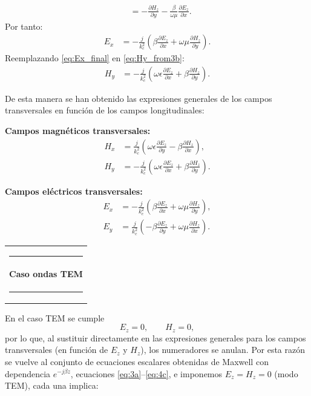 \documentclass[
  11pt,
  letterpaper,
   addpoints,
   answers
  ]{exam}
\makeatletter
\newlength{\rulelength}
\newcommand{\modtitle}[1]{%
  \settowidth{\rulelength}{\textbf{#1}}%
  \par\addvspace{6pt}\noindent%
  \begin{tabular}{@{}l@{}}
    \rule{\rulelength}{0.5pt}\\[3pt]%
    \textbf{#1}\\[3pt]%
    \rule{\rulelength}{0.5pt}%
  \end{tabular}%
  \par\addvspace{8pt}%
}
\makeatother
\begin{document}
\begin{questions}
\begin{parts}
\begin{solution}
\begin{minipage}[t]{0.49\linewidth}
\begin{align*}
&=-\frac{\partial H_z}{\partial y}-\frac{\beta}{\omega\mu}\frac{\partial E_z}{\partial x}.
\end{align*}
Por tanto:
\begin{align}
E_x&=-\frac{j}{k_c^2}\left(\beta\frac{\partial E_z}{\partial x}+\omega\mu\frac{\partial H_z}{\partial y}\right).
\label{eq:Ex_final}
\end{align}
Reemplazando \eqref{eq:Ex_final} en \eqref{eq:Hy_from3b}:
\begin{align}
H_y&=-\frac{j}{k_c^2}\left(\omega\epsilon\frac{\partial E_z}{\partial x}+\beta\frac{\partial H_z}{\partial y}\right).
\label{eq:Hy_final}
\end{align}
\end{minipage}
De esta manera se han obtenido las expresiones generales de los campos transversales en función de los campos longitudinales:
\newpage
\noindent
\begin{minipage}[t]{0.485\linewidth}
\textbf{Campos magnéticos transversales:}\\[-2pt]
\begin{align}
H_x &= \frac{j}{k_c^2}\!\left(\omega\epsilon\frac{\partial E_z}{\partial y}-\beta\frac{\partial H_z}{\partial x}\right),\\[4pt]
H_y &= -\frac{j}{k_c^2}\!\left(\omega\epsilon\frac{\partial E_z}{\partial x}+\beta\frac{\partial H_z}{\partial y}\right).
\end{align}
\end{minipage}%
\hfill
\begin{minipage}[t]{0.485\linewidth}
\textbf{Campos eléctricos transversales:}\\[-2pt]
\begin{align}
E_x &= -\frac{j}{k_c^2}\!\left(\beta\frac{\partial E_z}{\partial x}+\omega\mu\frac{\partial H_z}{\partial y}\right),\\[4pt]
E_y &= \frac{j}{k_c^2}\!\left(-\beta\frac{\partial E_z}{\partial y}+\omega\mu\frac{\partial H_z}{\partial x}\right).
\end{align}
\end{minipage}
\modtitle{Caso ondas TEM}
En el caso TEM se cumple
\[
E_z=0,\qquad H_z=0,
\]
por lo que, al sustituir directamente en las expresiones generales para los campos transversales (en función de $E_z$ y $H_z$), los numeradores se anulan. Por esta razón se vuelve al conjunto de ecuaciones escalares obtenidas de Maxwell con dependencia $e^{-j\beta z}$, ecuaciones \eqref{eq:3a}--\eqref{eq:4c}, e imponemos $E_z=H_z=0$ (modo TEM), cada una implica:
\begin{align}

\end{align}
\end{solution}
\end{parts}
\end{questions}
\end{document}
